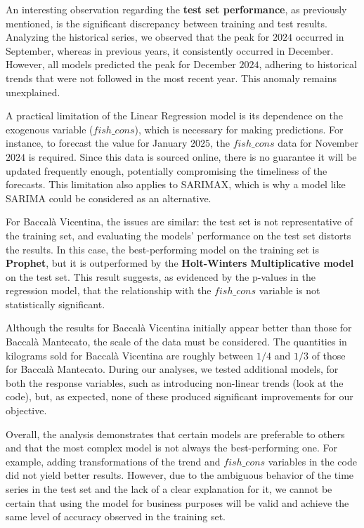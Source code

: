 \documentclass[10pt,twocolumn,letterpaper]{article}
\begin{document}
An interesting observation regarding the \textbf{test set performance}, as previously mentioned, is the significant discrepancy between training and test results. Analyzing the historical series, we observed that the peak for $2024$ occurred in September, whereas in previous years, it consistently occurred in December. However, all models predicted the peak for December $2024$, adhering to historical trends that were not followed in the most recent year. This anomaly remains unexplained.

A practical limitation of the Linear Regression model is its dependence on the exogenous variable ($fish\_cons$), which is necessary for making predictions. For instance, to forecast the value for January $2025$, the $fish\_cons$ data for November $2024$ is required. Since this data is sourced online, there is no guarantee it will be updated frequently enough, potentially compromising the timeliness of the forecasts. This limitation also applies to SARIMAX, which is why a model like SARIMA could be considered as an alternative.

For Baccalà Vicentina, the issues are similar: the test set is not representative of the training set, and evaluating the models' performance on the test set distorts the results. In this case, the best-performing model on the training set is \textbf{Prophet}, but it is outperformed by the \textbf{Holt-Winters Multiplicative model} on the test set. This result suggests, as evidenced by the p-values in the regression model, that the relationship with the $fish\_cons$ variable is not statistically significant.

Although the results for Baccalà Vicentina initially appear better than those for Baccalà Mantecato, the scale of the data must be considered. The quantities in kilograms sold for Baccalà Vicentina are roughly between $1/4$ and $1/3$ of those for Baccalà Mantecato. During our analyses, we tested additional models, for both the response variables, such as introducing non-linear trends (look at the code), but, as expected, none of these produced significant improvements for our objective.

Overall, the analysis demonstrates that certain models are preferable to others and that the most complex model is not always the best-performing one. For example, adding transformations of the trend and $fish\_cons$ variables in the code did not yield better results. However, due to the ambiguous behavior of the time series in the test set and the lack of a clear explanation for it, we cannot be certain that using the model for business purposes will be valid and achieve the same level of accuracy observed in the training set.
\end{document}
